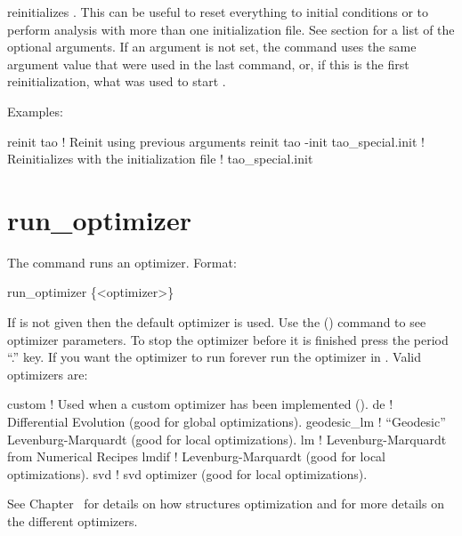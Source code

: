  reinitializes \tao. This can be useful to reset everything to
initial conditions or to perform analysis with more than one initialization file. See
section  for a list of the optional arguments.  If an argument is not
set, the  command uses the same argument value that were used in the last
 command, or, if this is the first reinitialization, what was used to
start \tao.

Examples:
\begin{example}
  reinit tao                         ! Reinit using previous arguments
  reinit tao -init tao_special.init  ! Reinitializes \tao with the initialization file 
                                     !   tao_special.init
\end{example}


\section{run_optimizer}
\label{s:run}

The  command runs an optimizer. Format:
\begin{example}
  run_optimizer \{<optimizer>\}
\end{example}

\vskip 10pt 

If  is not given then the default optimizer is used. 
Use the  () command to see optimizer parameters.
To stop the optimizer
before it is finished press the period ``.''  key. If you want the optimizer to run
forever run the optimizer in . Valid optimizers are:
\begin{example}
  custom        ! Used when a custom optimizer has been implemented ().
  de            ! Differential Evolution (good for global optimizations).
  geodesic_lm   ! ``Geodesic'' Levenburg-Marquardt (good for local optimizations).
  lm            ! Levenburg-Marquardt from Numerical Recipes 
  lmdif         ! Levenburg-Marquardt (good for local optimizations).
  svd           ! svd optimizer (good for local optimizations).
\end{example}

See Chapter~ for details on how \tao structures optimization and 
for more details on the different optimizers.

